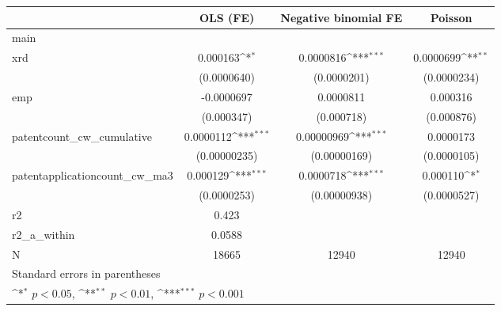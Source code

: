 {
\def\sym#1{\ifmmode^{#1}\else\(^{#1}\)\fi}
\begin{tabular}{l*{3}{c}}
\hline\hline
            &\multicolumn{1}{c}{OLS (FE)}&\multicolumn{1}{c}{Negative binomial FE}&\multicolumn{1}{c}{Poisson}\\
\hline
main        &                     &                     &                     \\
xrd         &    0.000163\sym{*}  &   0.0000816\sym{***}&   0.0000699\sym{**} \\
            & (0.0000640)         & (0.0000201)         & (0.0000234)         \\
[1em]
emp         &  -0.0000697         &   0.0000811         &    0.000316         \\
            &  (0.000347)         &  (0.000718)         &  (0.000876)         \\
[1em]
patentcount\_cw\_cumulative&   0.0000112\sym{***}&  0.00000969\sym{***}&   0.0000173         \\
            &(0.00000235)         &(0.00000169)         & (0.0000105)         \\
[1em]
patentapplicationcount\_cw\_ma3&    0.000129\sym{***}&   0.0000718\sym{***}&    0.000110\sym{*}  \\
            & (0.0000253)         &(0.00000938)         & (0.0000527)         \\
\hline
r2          &       0.423         &                     &                     \\
r2\_a\_within &      0.0588         &                     &                     \\
N           &       18665         &       12940         &       12940         \\
\hline\hline
\multicolumn{4}{l}{\footnotesize Standard errors in parentheses}\\
\multicolumn{4}{l}{\footnotesize \sym{*} \(p<0.05\), \sym{**} \(p<0.01\), \sym{***} \(p<0.001\)}\\
\end{tabular}
}
